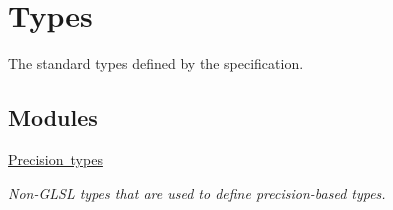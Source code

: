 \hypertarget{group__core__types}{}\section{Types}
\label{group__core__types}


The standard types defined by the specification.  


\subsection*{Modules}
\begin{DoxyCompactItemize}
\item 
\mbox{\hyperlink{group__core__precision}{Precision types}}
\begin{DoxyCompactList}\small\item\em Non-\/\+G\+L\+SL types that are used to define precision-\/based types. \end{DoxyCompactList}\end{DoxyCompactItemize}
